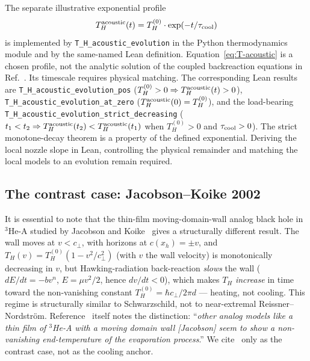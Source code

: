 \documentclass[prd,aps,twocolumn,floatfix,nofootinbib,superscriptaddress]{revtex4-2}
\newcommand{\Thawk}{T_{H}}
\begin{document}
The separate illustrative exponential profile
\begin{equation}
\Thawk^{\rm acoustic}(t) = \Thawk^{(0)} \cdot \exp(-t/\tau_{\rm cool})
\label{eq:T-acoustic}
\end{equation}
is implemented by \texttt{T\_H\_acoustic\_evolution} in the Python
thermodynamics module and by the same-named Lean definition.
Equation~\eqref{eq:T-acoustic} is a chosen profile, not the analytic
solution of the coupled backreaction equations in
Ref.~\cite{Balbinot2005PRD}. Its timescale requires physical matching.
The corresponding Lean results are \texttt{T\_H\_acoustic\_evolution\_pos}
($\Thawk^{(0)} > 0 \Rightarrow \Thawk^{\rm acoustic}(t) > 0$),
\texttt{T\_H\_acoustic\_evolution\_at\_zero}
($\Thawk^{\rm acoustic}(0) = \Thawk^{(0)}$), and the load-bearing
\texttt{T\_H\_acoustic\_evolution\_strict\_decreasing}
($t_1 < t_2 \Rightarrow \Thawk^{\rm acoustic}(t_2) < \Thawk^{\rm acoustic}(t_1)$
when $\Thawk^{(0)} > 0$ and $\tau_{\rm cool} > 0$). The strict
monotone-decay theorem is a property of the defined exponential.
Deriving the local nozzle slope in Lean, controlling the physical
remainder and matching the local models to an evolution remain required.

\subsection{The contrast case: Jacobson--Koike 2002}

It is essential to note that the thin-film moving-domain-wall analog
black hole in $^3$He-A studied by Jacobson and Koike~\cite{JacobsonKoike2002}
gives a structurally different result. The wall moves at $v < c_\perp$,
with horizons at $c(x_h) = \pm v$, and
$\Thawk(v) = \Thawk^{(0)}(1 - v^2/c_\perp^2)$
(with $v$ the wall velocity) is monotonically decreasing in $v$,
but Hawking-radiation back-reaction \emph{slows} the wall
($dE/dt = -bv^n$, $E = \mu v^2/2$, hence $dv/dt < 0$),
which makes $\Thawk$ \emph{increase} in time toward the non-vanishing
constant $\Thawk^{(0)} = \hbar c_\perp / 2\pi d$ --- heating, not cooling.
This regime is structurally similar to Schwarzschild, not to
near-extremal Reissner--Nordstr\"om. Reference~\cite{Balbinot2005PRD}
itself notes the distinction:
``\emph{other analog models like a thin film of $^3$He-A with a
moving domain wall [Jacobson] seem to show a non-vanishing
end-temperature of the evaporation process}.''
We cite~\cite{JacobsonKoike2002} only as the contrast case, not as the
cooling anchor.
\end{document}
